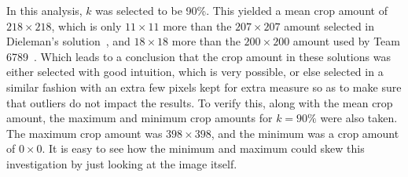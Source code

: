 \documentclass[12pt,a4paper,oneside,oldfontcommands]{memoir}
\begin{document}
In this analysis, \(k\) was selected to be 90\%. This yielded a mean crop amount of \(218\times218\), which is only \(11\times11\) more than the \(207\times207\) amount selected in Dieleman's solution~\cite{Sanders-GZ}, and \(18\times18\) more than the \(200\times200\) amount used by Team 6789~\cite{Nguyen}. Which leads to a conclusion that the crop amount in these solutions was either selected with good intuition, which is very possible, or else selected in a similar fashion with an extra few pixels kept for extra measure so as to make sure that outliers do not impact the results. To verify this, along with the mean crop amount, the maximum and minimum crop amounts for \(k=90\%\) were also taken. The maximum crop amount was \(398\times398\), and the minimum was a crop amount of \(0\times0\). It is easy to see how the minimum and maximum could skew this investigation by just looking at the image itself.  
\end{document}
